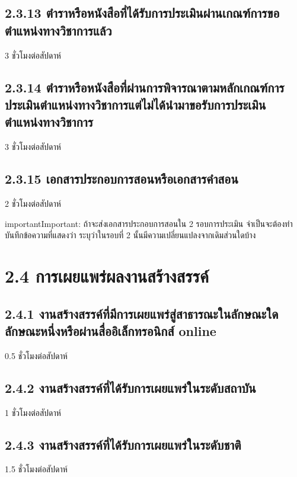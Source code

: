 \documentclass[a4paper,12pt,english]{sphinxmanual}
\begin{document}
\subsection{2.3.13 ตำราหรือหนังสือที่ได้รับการประเมินผ่านเกณฑ์การขอตำแหน่งทางวิชาการแล้ว}
\label{\detokenize{2research:id23}}
3 ชั่วโมงต่อสัปดาห์


\subsection{2.3.14 ตำราหรือหนังสือที่ผ่านการพิจารณาตามหลักเกณฑ์การประเมินตำแหน่งทางวิชาการแต่ไม่ได้นำมาขอรับการประเมินตำแหน่งทางวิชาการ}
\label{\detokenize{2research:id24}}
3 ชั่วโมงต่อสัปดาห์


\subsection{2.3.15 เอกสารประกอบการสอนหรือเอกสารคำสอน}
\label{\detokenize{2research:id25}}
2 ชั่วโมงต่อสัปดาห์

\begin{sphinxadmonition}{important}{Important:}
ถ้าจะส่งเอกสารประกอบการสอนใน 2 รอบการประเมิน จำเป็นจะต้องทำบันทึกข้อความที่แสดงว่า ระบุว่าในรอบที่ 2 นั้นมีความเปลี่ยนแปลงจากเดิมส่วนใดบ้าง
\end{sphinxadmonition}


\section{2.4 การเผยแพร่ผลงานสร้างสรรค์}
\label{\detokenize{2research:id26}}

\subsection{2.4.1 งานสร้างสรรค์ที่มีการเผยแพร่สู่สาธารณะในลักษณะใดลักษณะหนึ่งหรือผ่านสื่ออิเล็กทรอนิกส์ online}
\label{\detokenize{2research:online}}
0.5 ชั่วโมงต่อสัปดาห์


\subsection{2.4.2 งานสร้างสรรค์ที่ได้รับการเผยแพร่ในระดับสถาบัน}
\label{\detokenize{2research:id27}}
1 ชั่วโมงต่อสัปดาห์


\subsection{2.4.3 งานสร้างสรรค์ที่ได้รับการเผยแพร่ในระดับชาติ}
\label{\detokenize{2research:id28}}
1.5 ชั่วโมงต่อสัปดาห์
\end{document}
